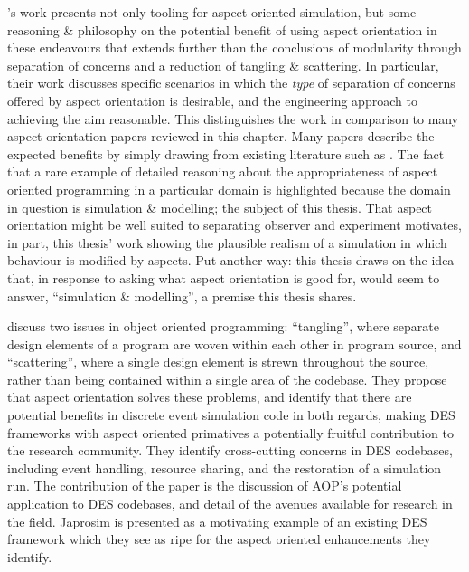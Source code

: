 \citeauthor{gulyas1999use}'s work presents not only tooling for
aspect oriented simulation, but some reasoning \& philosophy on the potential
benefit of using aspect orientation in these endeavours that extends further
than the conclusions of modularity through separation of concerns and a
reduction of tangling \& scattering. In particular, their work discusses
specific scenarios in which the \emph{type} of separation of concerns offered by
aspect orientation is desirable, and the engineering approach to achieving the
aim reasonable. This distinguishes the work in comparison to many aspect
orientation papers reviewed in this chapter. Many papers describe the expected
benefits by simply drawing from existing literature such as
\cite{kiczales1997aspect}. The fact that a rare example of detailed reasoning
about the appropriateness of aspect oriented programming in a particular domain
is highlighted because the domain in question is simulation \& modelling; the
subject of this thesis. That aspect orientation might be well suited to
separating observer and experiment motivates, in part, this thesis' work showing
the plausible realism of a simulation in which behaviour is modified by aspects.
Put another way: this thesis draws on the idea that, in response to
\citeauthor{steimann06paradoxical} asking what aspect orientation is good for,
\citeauthor{gulyas1999use} would seem to answer, ``simulation \& modelling'', a
premise this thesis shares.

\citeauthor{chibani2013toward} discuss two issues in object oriented
programming: ``tangling'', where separate design elements of a program are woven
within each other in program source, and ``scattering'', where a single design
element is strewn throughout the source, rather than being contained within a
single area of the codebase.
They propose that aspect orientation solves these problems, and identify that
there are potential benefits in discrete event simulation code in both regards,
making DES frameworks with aspect oriented primatives a potentially fruitful
contribution to the research community. They identify cross-cutting concerns in
DES codebases, including event handling, resource sharing, and the restoration
of a simulation run. The contribution of the paper is the discussion of AOP's
potential application to DES codebases, and detail of the avenues available for
research in the field. Japrosim is presented as a motivating example of an
existing DES framework which they see as ripe for the aspect oriented
enhancements they identify.

